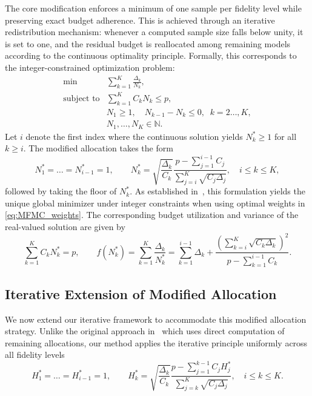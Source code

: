 The core modification enforces a minimum of one sample per fidelity level while preserving exact budget adherence. This is achieved through an iterative redistribution mechanism: whenever a computed sample size falls below unity, it is set to one, and the residual budget is reallocated among remaining models according to the continuous optimality principle. Formally, this corresponds to the integer-constrained optimization problem:
%
\begin{equation}\label{eq:Optimization_pb_integer}
    \begin{array}{ll}
    \min  &\sum_{k=1}^K\frac{\Delta_k}{N_k},\\
       \text{subject to} &\displaystyle\sum\limits_{k=1}^K C_kN_k\le p,\\[2pt]
       &\displaystyle N_1\ge 1,\quad \displaystyle N_{k-1}-N_k\le 0, \;\; k=2\ldots,K,\\
       &N_1,\ldots, N_K\in \mathbb{N}.
    \end{array}
\end{equation}
%
Let $i$ denote the first index where the continuous solution yields $N_k^* \geq 1$ for all $k \geq i$. The modified allocation takes the form
%
\begin{equation}
    \label{eq:Modified_sample_size_floor_real_valued}
    N_1^* =\ldots=N_{i-1}^*= 1, \qquad N_k^* = \sqrt{\dfrac{\Delta_k}{C_k}}
        \dfrac{p - \sum_{j=1}^{i-1} C_j}
        {\sum_{j=i}^{K} \sqrt{C_j \Delta_j}},\quad  i \le k \le K,
\end{equation}
%
followed by taking the floor of $N_k^*$.
As established in~\cite{GrGuJuWa:2023}, this formulation yields the unique global minimizer under integer constraints when using optimal weights in \eqref{eq:MFMC_weights}. The corresponding budget utilization and variance of the real-valued solution are given by
%
\begin{equation}\label{eq:Modified_f_real_valued}
    \sum_{k=1}^K C_k N_k^* = p, 
    \qquad 
    f(N_k^*) = \sum_{k=1}^K \frac{\Delta_k}{N_k^*}
    = \sum_{k=1}^{i-1} \Delta_k 
    + \frac{\left(\sum_{k=i}^K \sqrt{C_k \Delta_k}\right)^2}
    {p - \sum_{k=1}^{i-1} C_k}.
\end{equation}
%


\subsection{Iterative Extension of Modified Allocation}

We now extend our iterative framework to accommodate this modified allocation strategy. Unlike the original approach in~\cite{GrGuJuWa:2023} which uses direct computation of remaining allocations, our method applies the iterative principle uniformly across all fidelity levels
\begin{equation}
    \label{eq:Modified_sample_size_iterative_real_valued}
    H_1^* = \ldots = H_{i-1}^* =1, \qquad H_k^*=\sqrt{\frac{\Delta_k}{C_k}}\frac{p-\sum_{j=1}^{k-1}C_j  H_j^* }{\sum_{j=k}^{K}\sqrt{C_j\Delta_j}}, \quad i\le k\le K.
\end{equation}


